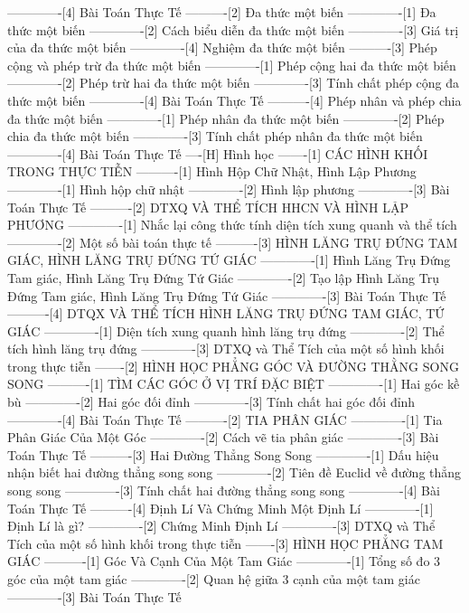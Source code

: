 -------------[4] Bài Toán Thực Tế
----------[2] Đa thức một biến
-------------[1] Đa thức một biến
-------------[2] Cách biểu diễn đa thức một biến
-------------[3] Giá trị của đa thức một biến
-------------[4] Nghiệm đa thức một biến
----------[3] Phép cộng và phép trừ đa thức một biến
-------------[1] Phép cộng hai đa thức một biến
-------------[2] Phép trừ hai đa thức một biến
-------------[3] Tính chất phép cộng đa thức một biến
-------------[4] Bài Toán Thực Tế
----------[4] Phép nhân và phép chia đa thức một biến
-------------[1] Phép nhân đa thức một biến
-------------[2] Phép chia đa thức một biến
-------------[3] Tính chất phép nhân đa thức một biến
-------------[4] Bài Toán Thực Tế
----[H] Hình học
-------[1] CÁC HÌNH KHỐI TRONG THỰC TIỄN
----------[1] Hình Hộp Chữ Nhật, Hình Lập Phương
-------------[1] Hình hộp chữ nhật
-------------[2] Hình lập phương
-------------[3] Bài Toán Thực Tế
----------[2] DTXQ VÀ THỂ TÍCH HHCN VÀ HÌNH LẬP PHƯƠNG
-------------[1] Nhắc lại công thức tính diện tích xung quanh và thể tích
-------------[2] Một số bài toán thực tế
----------[3] HÌNH LĂNG TRỤ ĐỨNG TAM GIÁC, HÌNH LĂNG TRỤ ĐỨNG TỨ GIÁC
-------------[1] Hình Lăng Trụ Đứng Tam giác, Hình Lăng Trụ Đứng Tứ Giác
-------------[2] Tạo lập Hình Lăng Trụ Đứng Tam giác, Hình Lăng Trụ Đứng Tứ Giác
-------------[3] Bài Toán Thực Tế
----------[4] DTQX VÀ THỂ TÍCH HÌNH LĂNG TRỤ ĐỨNG TAM GIÁC, TỨ GIÁC
-------------[1] Diện tích xung quanh hình lăng trụ đứng
-------------[2] Thể tích hình lăng trụ đứng
-------------[3] DTXQ và Thể Tích của một số hình khối trong thực tiễn
-------[2] HÌNH HỌC PHẲNG GÓC VÀ ĐƯỜNG THẰNG SONG SONG
----------[1] TÌM CÁC GÓC Ở VỊ TRÍ ĐẶC BIỆT
-------------[1] Hai góc kề bù
-------------[2] Hai góc đối đỉnh
-------------[3] Tính chất hai góc đối đỉnh
-------------[4] Bài Toán Thực Tế
----------[2] TIA PHÂN GIÁC
-------------[1] Tia Phân Giác Của Một Góc
-------------[2] Cách vẽ tia phân giác
-------------[3] Bài Toán Thực Tế
----------[3] Hai Đường Thẳng Song Song
-------------[1] Dấu hiệu nhận biết hai đường thẳng song song
-------------[2] Tiên đề Euclid về đường thẳng song song
-------------[3] Tính chất hai đường thẳng song song
-------------[4] Bài Toán Thực Tế
----------[4] Định Lí Và Chứng Minh Một Định Lí
-------------[1] Định Lí là gì?
-------------[2] Chứng Minh Định Lí
-------------[3] DTXQ và Thể Tích của một số hình khối trong thực tiễn
-------[3] HÌNH HỌC PHẲNG TAM GIÁC
----------[1] Góc Và Cạnh Của Một Tam Giác
-------------[1] Tổng số đo 3 góc của một tam giác
-------------[2] Quan hệ giữa 3 cạnh của một tam giác
-------------[3] Bài Toán Thực Tế
